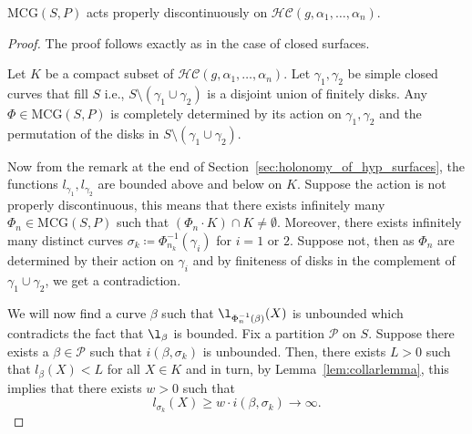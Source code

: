 \begin{theorem}\label{thm:mcg_action_is_prop_disc}
	$\text{MCG}(S,P)$ acts properly discontinuously on $\mathcal{HC}(g,\alpha_1,\ldots,\alpha_n)$.
\end{theorem}

\begin{proof}
	
	The proof follows exactly as in the case of closed surfaces.
	
	Let $K$ be a compact subset of $\mathcal{HC}(g,\alpha_1,\ldots,\alpha_n)$. Let $\gamma_1,\gamma_2$ be simple closed curves that fill $S$ i.e., $S \setminus (\gamma_1 \cup \gamma_2)$ is a disjoint union of finitely disks. Any $\Phi \in \text{MCG}(S,P)$ is completely determined by its action on $\gamma_1, \gamma_2$ and the permutation of the disks in $S \setminus (\gamma_1 \cup \gamma_2)$. 
	
	Now from the remark at the end of Section~\ref{sec:holonomy_of_hyp_surfaces}, the functions $l_{\gamma_1}, l_{\gamma_2}$ are bounded above and below on $K$. Suppose the action is not properly discontinuous, this means that there exists infinitely many $\Phi_n \in \text{MCG}(S,P)$ such that $(\Phi_n \cdot K) \cap K \neq \emptyset$. Moreover, there exists infinitely many distinct curves $\sigma_k \coloneqq \Phi_{n_k}^{-1}(\gamma_i)$ for $i = 1 \text{ or } 2$. Suppose not, then as $\Phi_{n}$ are determined by their action on $\gamma_i$ and by finiteness of disks in the complement of $\gamma_1 \cup \gamma_2$, we get a contradiction.
	
	We will now find a curve $\beta$ such that $\l_{\Phi_n^{-1}(\beta)} (X)$ is unbounded which contradicts the fact that $\l_\beta$ is bounded. Fix a partition $\mathcal{P}$ on $S$. Suppose there exists a $\beta \in \mathcal{P}$ such that $i(\beta, \sigma_k)$ is unbounded. Then, there exists $L > 0$ such that $l_\beta (X) < L$ for all $X \in K$ and in turn, by Lemma~\ref{lem:collarlemma}, this implies that there exists $w > 0$ such that \[l_{\sigma_k}(X) \geq w \cdot i(\beta, \sigma_k) \rightarrow \infty.\] 
	

\end{proof}

